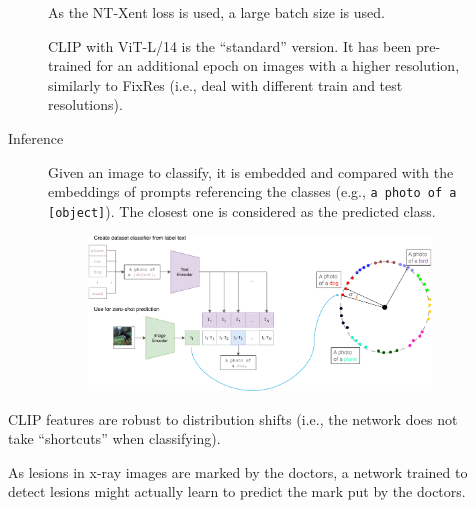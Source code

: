 \begin{description}
\begin{description}
                \begin{remark}
                    As the NT-Xent loss is used, a large batch size is used.
                \end{remark}

                \begin{remark}
                    CLIP with ViT-L/14 is the ``standard'' version. It has been pre-trained for an additional epoch on images with a higher resolution, similarly to FixRes (i.e., deal with different train and test resolutions).
                \end{remark}

            \item[Inference]
                Given an image to classify, it is embedded and compared with the embeddings of prompts referencing the classes (e.g., \texttt{a photo of a [object]}). The closest one is considered as the predicted class.
                \begin{figure}[H]
                    \centering
                    \includegraphics[width=0.85\linewidth]{./img/_clip_inference.pdf}
                \end{figure}
        \end{description}

        \begin{remark}
            CLIP features are robust to distribution shifts (i.e., the network does not take ``shortcuts'' when classifying).

            \indenttbox
            \begin{example}
                As lesions in x-ray images are marked by the doctors, a network trained to detect lesions might actually learn to predict the mark put by the doctors.
            \end{example}


\end{remark}
\end{description}
